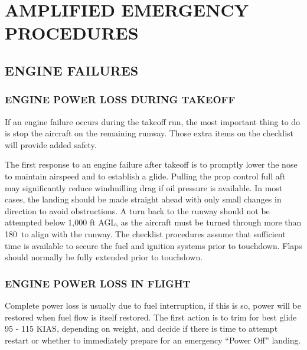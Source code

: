 \cleardoublepage


\section{AMPLIFIED EMERGENCY PROCEDURES}

\subsection{ENGINE FAILURES}
\subsubsection{ENGINE POWER LOSS DURING TAKEOFF}

If an engine failure occurs during the takeoff run, the most important
thing to do is stop the aircraft on the remaining runway. Those extra
items on the checklist will provide added safety.

The first response to an engine failure after takeoff is to promptly
lower the nose to maintain airspeed and to establish a glide.  Pulling the prop control full aft may significantly reduce windmilling drag if oil pressure
is available. In most
cases, the landing should be made straight ahead with only small changes
in direction to avoid obstructions. A turn back to the runway should
not be attempted below 1,000 ft AGL, as the aircraft must be turned
through more than 180\textdegree \ to align with the runway. The checklist procedures
assume that sufficient time is available to secure the fuel and ignition
systems prior to touchdown. Flaps should normally be fully extended
prior to touchdown.

\subsubsection{ENGINE POWER LOSS IN FLIGHT}

Complete power loss is usually due to fuel interruption, if this is
so, power will be restored when fuel flow is itself restored. The
first action is to trim for best glide 95 - 115 KIAS, depending on
weight, and decide if there is time to attempt restart or whether to immediately
prepare for an emergency ``Power Off'' landing.


